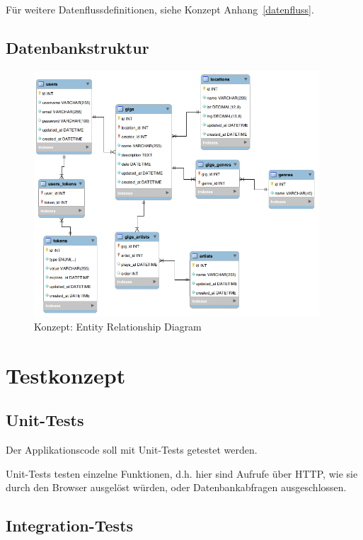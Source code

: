 Für weitere Datenflussdefinitionen, siehe Konzept Anhang~\ref{datenfluss}.

\clearpage
\subsection{Datenbankstruktur}

\begin{figure}[!htb]
  \centering
  \includegraphics[width=0.95\textwidth]{konzept/erd.png}
  \caption{Konzept: Entity Relationship Diagram}
\end{figure}

\clearpage
\section{Testkonzept}

\subsection{Unit-Tests}

Der Applikationscode soll mit Unit-Tests getestet werden.

Unit-Tests testen einzelne Funktionen, d.h. hier sind Aufrufe über HTTP, wie
sie durch den Browser ausgelöst würden, oder Datenbankabfragen ausgeschlossen.

\subsection{Integration-Tests}

